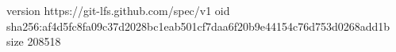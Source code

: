 version https://git-lfs.github.com/spec/v1
oid sha256:af4d5fc8fa09c37d2028bc1eab501cf7daa6f20b9e44154c76d753d0268add1b
size 208518
